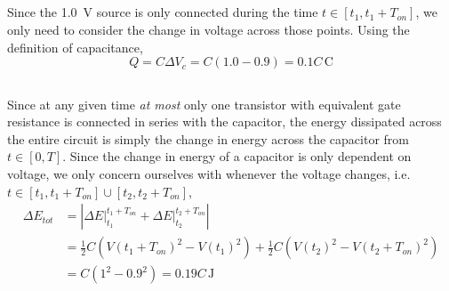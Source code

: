 \documentclass[]{article}
\begin{document}
\begin{center}
\end{center}

\subsection{}

Since the \SI{1.0}{\volt} source is only connected during the time \(t \in [t_1, t_1 + T_{on}]\), we only need to consider the change in voltage across those points.
Using the definition of capacitance,
\begin{equation}
	Q = C \Delta V_c = C (1.0 - 0.9) = 0.1 C \, \si{\coulomb}
\end{equation}

\subsection{}

Since at any given time \emph{at most} only one transistor with equivalent gate resistance is connected in series with the capacitor, the energy dissipated across the entire circuit is simply the change in energy across the capacitor from \(t \in [0, T]\).
Since the change in energy of a capacitor is only dependent on voltage, we only concern ourselves with whenever the voltage changes, i.e. \(t \in [t_1, t_1 + T_{on}] \cup [t_2, t_2 + T_{on}]\),
\begin{align}
	\Delta E_{tot} &= |\left.\Delta E\right|_{t_1}^{t_1 + T_{on}} + \left.\Delta E\right|_{t_2}^{t_2 + T_{on}}| \\
	&= \frac{1}{2} C(V(t_1 + T_{on})^2 - V(t_1)^2) + \frac{1}{2} C(V(t_2)^2 - V(t_2 + T_{on})^2) \\
	&= C (1^2 - 0.9^2) = 0.19C \, \si{\joule}
\end{align}

\newpage

%
\end{document}
